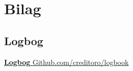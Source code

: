 \section{Bilag}

\subsection{Logbog}
\href{https://github.com/creditoro/logbook}{\textbf{Logbog} Github.com/creditoro/logbook}

\newpage


\newpage

\newpage